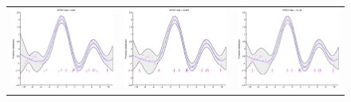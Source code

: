 \documentclass{article} %
\begin{document}
\begin{figure}
\centering
\begin{tabular}{ccc}
\includegraphics[scale=0.3]{figures/func3-svi-lrate1e-03.eps} &
\includegraphics[scale=0.3]{figures/func3-svi-lrate1e-04.eps} &
\includegraphics[scale=0.3]{figures/func3-svi-lrate1e-05.eps} \\

\end{tabular}
\end{figure}
\end{document}
